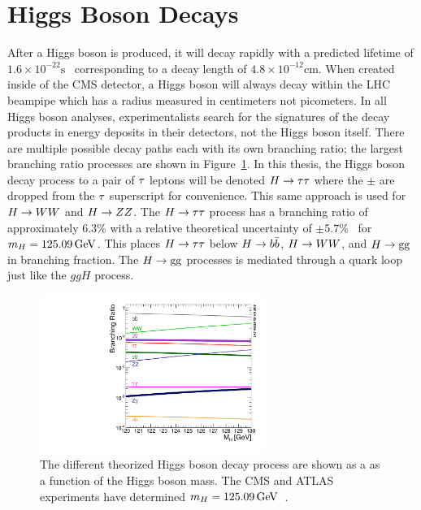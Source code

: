 \section{Higgs Boson Decays}
\label{sec:higgs_decays}
After a Higgs boson is produced, it will decay rapidly with a predicted lifetime
of $1.6 \times 10^{-22}\text{s}$~\cite{Dittmaier:2012vm} corresponding to a decay length of 
$4.8 \times 10^{-12}\text{cm}$. When created
inside of the CMS detector, a Higgs boson will always decay
within the LHC beampipe which has a radius measured in centimeters not picometers. 
In all Higgs boson analyses, experimentalists search for the
signatures of the decay products in energy deposits in their detectors, not the Higgs
boson itself. There are multiple possible decay
paths each with its own branching ratio; the largest branching ratio
processes are shown in Figure~\ref{fig:higgs_decay}. 
In this thesis, the Higgs boson decay process to a pair of $\tau$ leptons will be denoted
$H\to\tau\tau$ where the $\pm$ are dropped from the $\tau$ superscript
for convenience. This same approach is used for $H\to WW$ and $H\to ZZ$.
The $H\to\tau\tau$ process has a branching
ratio of approximately 6.3\% with a relative theoretical uncertainty of 
$\pm5.7\%$~\cite{deFlorian:2016spz} for $m_{H} = 125.09\,\mathrm{GeV}$. This places $H\to\tau\tau$ below $H\to b\bar{b}$, 
$H\to WW$, and $H\to\text{g}\text{g}$ in branching fraction.
The $H\to\text{g}\text{g}$ processes is mediated through a quark loop just like the $ggH$ process.

\begin{figure}[htbp]
\centering
     \includegraphics[width=0.65\textwidth]{phenomenology_of_processes/plots/SMHiggsBR_YR4-square.pdf}
     \caption{
The different theorized Higgs boson decay process are shown as a 
as a function of the Higgs boson mass.
The CMS and ATLAS experiments have determined $m_{H} = 125.09\,\mathrm{GeV}$~\cite{Aad:2015zhl}.
     }
     \label{fig:higgs_decay}
\end{figure}

